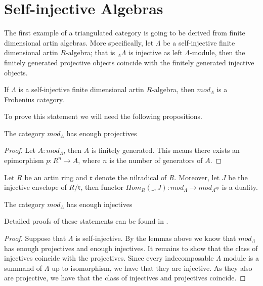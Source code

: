 \section{Self-injective Algebras}

    The first example of a triangulated category is going to be derived from finite dimensional artin algebras. More specifically, let $\Lambda$ be a self-injective finite dimensional artin $R$-algebra; that is $_{\Lambda}\Lambda$ is injective as left $\Lambda$-module, then the finitely generated projective objects coincide with the finitely generated injective objects.

    \begin{prop}
        If $\Lambda$ is a self-injective finite dimensional artin $R$-algebra, then $mod_{\Lambda}$ is a Frobenius category.
    \end{prop}

    To prove this statement we will need the following propositions.

    \begin{lemma}
        The category $mod_{\Lambda}$ has enough projectives
    \end{lemma}

    \begin{proof}
        Let $A:mod_{\Lambda}$, then $A$ is finitely generated. This means there exists an epimorphism $p:R^n\rightarrow A$, where $n$ is the number of generators of $A$.
    \end{proof}

    \begin{lemma}
        Let $R$ be an artin ring and $\mathfrak{r}$ denote the nilradical of $R$. Moreover, let $J$ be the injective envelope of $R/\mathfrak{r}$, then functor $Hom_R(\_,J):mod_{\Lambda}\rightarrow mod_{\Lambda^{op}}$ is a duality.
    \end{lemma}

    \begin{corollary}
        The category $mod_{\Lambda}$ has enough injectives
    \end{corollary}

    Detailed proofs of these statements can be found in \cite{Rei95}.

    \begin{proof}
        Suppose that $\Lambda$ is self-injective. By the lemmas above we know that $mod_{\Lambda}$ has enough projectives and enough injectives. It remains to show that the class of injectives coincide with the projectives. Since every indecomposable $\Lambda$ module is a summand of $\Lambda$ up to isomorphism, we have that they are injective. As they also are projective, we have that the class of injectives and projectives coincide.
    \end{proof}

